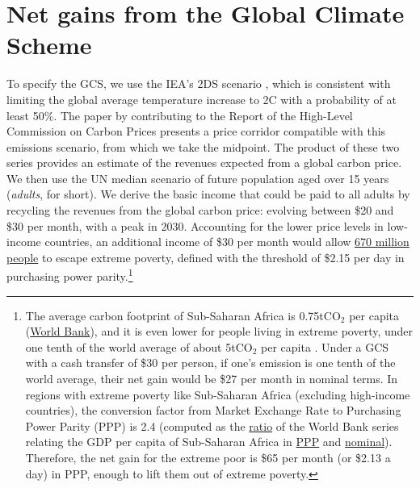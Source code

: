 \clearpage
\section{Net gains from the Global Climate Scheme}\label{app:gain_gcs}

To specify the GCS, we use the IEA's 2DS scenario , which is consistent with limiting the global average temperature increase to 2\textdegree{}C with a probability of at least 50\%. The paper by  contributing to the Report of the High-Level Commission on Carbon Prices  presents a price corridor compatible with this emissions scenario, from which we take the midpoint. The product of these two series provides an estimate of the revenues expected from a global carbon price. We then use the UN median scenario of future population aged over 15 years (\textit{adults}, for short). We derive the basic income that could be paid to all adults by recycling the revenues from the global carbon price: evolving between \$20 and \$30 per month, with a peak in 2030. Accounting for the lower price levels in low-income countries, an additional income of \$30 per month would allow \href{https://data.worldbank.org/indicator/SI.POV.DDAY}{670 million people} to escape extreme poverty, defined with the threshold of \$2.15 per day in purchasing power parity.\footnote{The average carbon footprint of Sub-Saharan Africa is 0.75tCO$_{\text{2}}$ per capita (\href{https://www.macrotrends.net/countries/SSF/sub-saharan-africa-/carbon-co2-emissions}{World Bank}), and it is even lower for people living in extreme poverty, under one tenth of the world average of about 5tCO$_{\text{2}}$ per capita . Under a GCS with a cash transfer of \$30 per person, if one's emission is one tenth of the world average, their net gain would be \$27 per month in nominal terms. In regions with extreme poverty like Sub-Saharan Africa (excluding high-income countries), the conversion factor from Market Exchange Rate to Purchasing Power Parity (PPP) is 2.4 (computed as the \href{https://data.worldbank.org/indicator/PA.NUS.PPPC.RF}{ratio} of the World Bank series relating the GDP per capita of Sub-Saharan Africa in \href{https://data.worldbank.org/indicator/NY.GDP.PCAP.PP.KD?locations=ZG&year_high_desc=true}{PPP} and \href{https://data.worldbank.org/indicator/NY.GDP.PCAP.KD?locations=ZG&year_high_desc=true}{nominal}). Therefore, the net gain for the extreme poor is \$65 per month (or \$2.13 a day) in PPP, enough to lift them out of extreme poverty.%
} 

